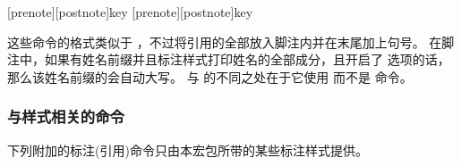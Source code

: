 \begin{ltxsyntax}
[prenote][postnote]{key}
[prenote][postnote]{key}


这些命令的格式类似于 ，不过将引用的全部放入脚注内并在末尾加上句号。
在脚注中，如果有姓名前缀并且标注样式打印姓名的全部成分，且开启了  选项的话，那么该姓名前缀的会自动大写。
 与  的不同之处在于它使用  而不是  命令。

\end{ltxsyntax}

\subsubsection{与样式相关的命令}%
\label{use:cit:cbx}

下列附加的标注(引用)命令只由本宏包所带的某些标注样式提供。

